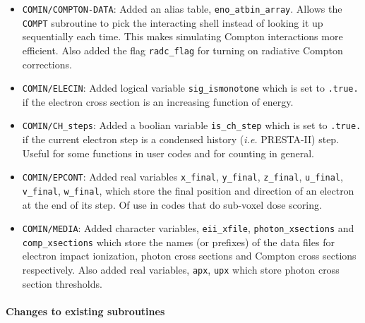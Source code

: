 \begin{itemize}

\item
{}
{\tt COMIN/COMPTON-DATA}: Added an alias table, 
{\tt eno\_atbin\_array}.  Allows the {\tt COMPT} subroutine to pick the 
interacting shell instead of looking it up sequentially each time.  This
makes simulating Compton interactions more efficient.  Also added the
flag {\tt radc\_flag} for turning on radiative Compton corrections.

\item {\tt COMIN/ELECIN}: Added logical variable
{\tt sig\_ismonotone} which is set to {\tt .true.} if the electron
cross section is an increasing function of energy.  

\item
{}
{\tt COMIN/CH\_steps}: Added a boolian variable {\tt is\_ch\_step} which
is set to {\tt .true.} if the current electron step is a condensed
history ({\em i.e.} PRESTA-II) step.  Useful for some functions in
user codes and for counting in general.

\item 
{}
{\tt COMIN/EPCONT}: Added real variables {\tt x\_final}, {\tt y\_final}, {\tt z\_final},
{\tt u\_final}, {\tt v\_final}, {\tt w\_final}, which store the final
position and direction of an electron at the end of its step.  Of use 
in codes that do sub-voxel dose scoring. 

\item
{}
{\tt COMIN/MEDIA}: Added character variables, {\tt eii\_xfile},
{\tt photon\_xsections} and {\tt comp\_xsections} which store the names
(or prefixes) of the data files for electron impact ionization, photon
cross sections and Compton cross sections respectively.  Also added 
real variables, {\tt apx}, {\tt upx} which store photon cross section
thresholds.

\end{itemize}

\paragraph{Changes to existing subroutines}


